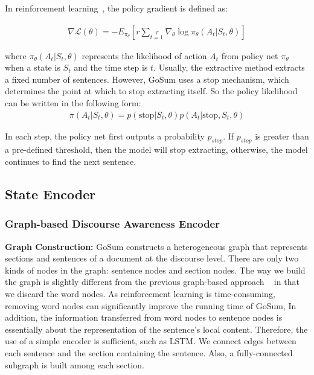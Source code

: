 \documentclass[11pt,a4paper]{article}
\begin{document}
In reinforcement learning~\cite{rl_1992}, the policy gradient is defined as:

\begin{align}
    \nabla \mathcal{L} (\theta) = -E_{\pi_\theta} \left[  r \sum\limits_{t=1}\limits^T \nabla_{\theta} \log \pi_{\theta} (A_t|S_t,\theta)  \right]
\end{align}

where $\pi_{\theta} (A_t|S_t,\theta)$ represents the likelihood of action $A_t$ from policy net $\pi_{\theta}$ when a state is $S_t$ and the time step is $t$.
Usually, the extractive method extracts a fixed number of sentences. However, GoSum uses a stop mechanism, which  determines the point at which to stop extracting itself. So the policy likelihood can be written in the following form:
\begin{align}
    \pi(A_t|S_t,\theta) = p(\text{stop} | S_t, \theta) p(A_t|\text{stop}, S_t,\theta)
\end{align}

In each step, the policy net first outputs a probability $p_{stop}$. If $p_{stop}$ is greater than a pre-defined threshold, then the model will stop extracting, otherwise, the model continues to find the next sentence.


\subsection{State Encoder}

\subsubsection{Graph-based Discourse Awareness Encoder}

\noindent \textbf{Graph Construction:}
GoSum constructs a heterogeneous graph that represents sections and sentences of a document at the discourse level.
There are only two kinds of nodes in the graph: sentence nodes and section nodes.
The way we build the graph is slightly different from the previous graph-based approach ~\cite{discourse_2021,hsg_2020,hahsum_2020} in that we discard the word nodes.
As reinforcement learning is  time-consuming, removing word nodes can significantly improve the running time  of GoSum, 
In addition, the information transferred from word nodes to sentence nodes is essentially about the representation of the sentence's local content.  Therefore, the use of a simple encoder is sufficient, such as LSTM.
We connect edges between each sentence and the section containing the sentence.
Also, a fully-connected subgraph is built among each section.
\end{document}
